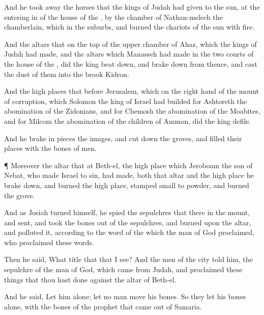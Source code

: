 {And he took
away the
horses that the
kings of
Judah had
given to the
sun, at the entering
in of the
house of the
{}, by the
chamber of
Nathan-melech the
chamberlain, which
{} in the
suburbs, and
burned the
chariots of the
sun with
fire.

And the
altars that
{} on the
top of the upper
chamber of
Ahaz, which the
kings of
Judah had
made, and the
altars which
Manasseh had
made in the
two
courts of the
house of the
{}, did the
king beat
down, and brake
{}
down from thence, and
cast the
dust of them into the
brook
Kidron.

And the high
places that
{}
before
Jerusalem, which
{} on the right
hand of the
mount of
corruption, which
Solomon the
king of
Israel had
builded for
Ashtoreth the
abomination of the
Zidonians, and for
Chemosh the
abomination of the
Moabites, and for
Milcom the
abomination of the
children of
Ammon, did the
king
defile.

And he brake in
pieces the
images, and cut
down the
groves, and
filled their
places with the
bones of
men.


\par }{\PP {}¶ Moreover the
altar that
{} at
Beth-el,
{} the high
place which
Jeroboam the
son of
Nebat, who made
Israel to
sin, had
made, both that
altar and the high
place he brake
down, and
burned the high
place,
{}
stamped
{} small to
powder, and
burned the
grove.

And as
Josiah
turned himself, he
spied the
sepulchres that
{} there in the
mount, and
sent, and
took the
bones out of the
sepulchres, and
burned
{} upon the
altar, and
polluted it, according to the
word of the
{} which the
man of
God
proclaimed, who
proclaimed these
words.

Then he
said, What
title
{}
that that I
see? And the
men of the
city
told him,
{} the
sepulchre of the
man of
God, which
came from
Judah, and
proclaimed these
things that thou hast
done against the
altar of
Beth-el.

And he
said, Let him
alone; let no
man
move his
bones. So they let his
bones
alone, with the
bones of the
prophet that came
out of
Samaria.

}
